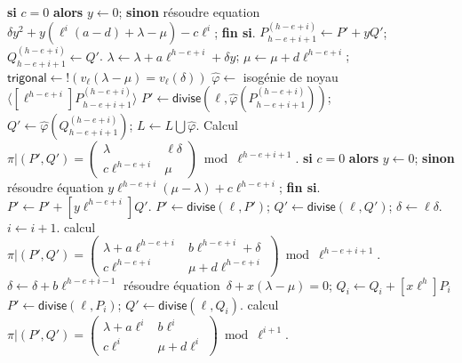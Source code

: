 \documentclass[10pt,a4paper]{book}
\theoremstyle{plain}
\theoremstyle{definition}
\theoremstyle{definition}
\theoremstyle{definition}
\theoremstyle{definition}
\theoremstyle{remark}
\theoremstyle{remark}
\theoremstyle{definition}
\begin{document}
\begin{algorithm}
\begin{algorithmic}[1]
\STATE \textbf{si} $c = 0$ \textbf{alors} $y \leftarrow 0$;
\STATE\label{alg:ult:trigonal:solve1} \textbf{sinon}  résoudre equation 
$ \delta  y^2 + y (\ell^i(a-d)+\lambda - \mu) - c\ell^i $; \textbf{fin  si}.
\STATE\label{alg:ult:trigonal:upd-P}
  $P_{h-e+i+1}^{(h-e+i)} \leftarrow P' + y Q'$; $Q_{h-e+i+1}^{(h-e+i)} \leftarrow Q'$.
\STATE $\lambda \leftarrow \lambda + a \ell^{h-e+i} + \delta y$; $\mu \leftarrow \mu + d \ell^{h-e+i} $; $ \mathsf{trigonal} \leftarrow !(v_{\ell}(\lambda - \mu)=v_{\ell}(\delta))$ %
\STATE\label{alg:ult:rem:iso}  $\widehat{\varphi} \leftarrow $ isogénie de noyau $\langle [\ell^{h-e+i}]P_{h-e+i+1}^{(h-e+i)} \rangle$
\STATE\label{alg:ult:rem:divide}
  $P' \leftarrow \mathsf{divise}(\ell, \widehat{\varphi}(P_{h-e+i+1}^{(h-e+i)}))$; $Q' \leftarrow  \widehat{\varphi}(Q_{h-e+i+1}^{(h-e+i)})$; $L \leftarrow L \bigcup \widehat{\varphi} $.
\STATE\label{alg:ult:rem:frobenius}
  Calcul $\pi|(P',Q')=\left( \begin{smallmatrix}
\lambda  & \ell \delta \\
c\ell^{h-e+i} & \mu  \end{smallmatrix} \right) \bmod {\ell^{h-e+i+1}}.$
\STATE 
  \textbf{si} $c=0$ \textbf{alors} $y \leftarrow 0 $; 
\STATE\label{alg:ult:rem:solve1}
  \textbf{sinon} résoudre équation
 $y\ell^{h-e+i}(\mu - \lambda) + c \ell^{h-e+i}$; \textbf{fin si}.
\STATE
  $P' \leftarrow P' + [y \ell^{h-e+i}] Q'$.
\STATE\label{alg:ult:trigonal:divide}
  $P' \leftarrow \mathsf{divise}(\ell, P')$; $Q' \leftarrow \mathsf{divise} (\ell, Q')$; $\delta \leftarrow \ell \delta $.
\STATE $i \leftarrow i+1$.
\STATE\label{alg:ult:trigonal:frob}  calcul $\pi|(P',Q')=\left( \begin{smallmatrix}
\lambda + a\ell^{h-e+i} & b\ell^{h-e+i} + \delta\\
c\ell^{h-e+i} & \mu + d\ell^{h-e+i} \end{smallmatrix} \right) \bmod {\ell^{h-e+i+1}}.$  
\STATE $\delta \leftarrow \delta + b \ell^{h-e+i-1}$
\ENDWHILE \label{alg:ult:trigonal:fin}
\STATE \label{alg:ult:init:dia}
résoudre équation~$\delta + x(\lambda - \mu) = 0$;
\STATE 
$Q_{i} \leftarrow Q_{i}+[x \ell^h]P_{i}$
 \label{alg:ult:diagonal:debut} %
\STATE
  $P' \leftarrow \mathsf{divise}(\ell, P_{i})$; $Q' \leftarrow \mathsf{divise} (\ell, Q_{i})$.
\STATE calcul $\pi|(P',Q')=\left( \begin{smallmatrix}
\lambda + a\ell^{i} & b\ell^{i} \\
c\ell^{i} & \mu + d\ell^{i} \end{smallmatrix} \right) \bmod {\ell^{i+1}}.$  

\end{algorithmic}
\end{algorithm}
\end{document}
